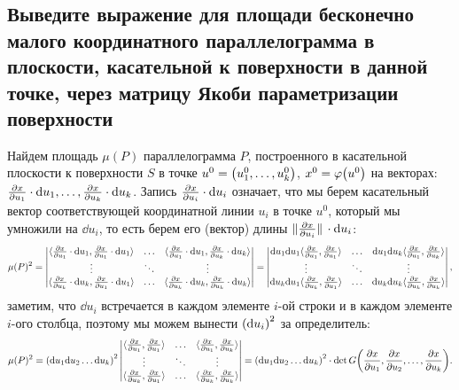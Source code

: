
\subsection{Выведите выражение для площади бесконечно малого координатного параллелограмма в плоскости, касательной к поверхности в данной точке, через матрицу Якоби параметризации поверхности}

Найдем площадь $\mu(P)$ параллелограмма $P$, построенного в касательной плоскости к поверхности $S$ в точке $u^{0} = \pqty{u_{1}^{0}, \ldots, u_{k}^{0}}$, $x^{0} = \varphi\pqty{u^{0}}$ на векторах: $\pdv{x}{u_{1}} \cdot \dd u_{1}, \ldots, \pdv{x}{u_{k}} \cdot \dd u_{k}$.
Запись $\pdv{x}{u_{i}} \cdot \dd u_{i}$ означает, что мы берем касательный вектор соответствующей координатной линии $u_{i}$ в точке $u^{0}$, который мы умножили на $\dd u_{i}$, то есть берем его (вектор) длины $\norm{\pdv{x}{u_{i}}} \cdot \dd u_{i}$:
\[
    \mu(P)^{2} = \begin{vmatrix}
        \langle \pdv{x}{u_{1}} \cdot \dd u_{1}, \pdv{x}{u_{1}} \cdot \dd u_{1} \rangle & \ldots & \langle \pdv{x}{u_{1}} \cdot \dd u_{1}, \pdv{x}{u_{k}} \cdot \dd u_{k} \rangle \\
        \vdots & \ddots & \vdots \\
        \langle \pdv{x}{u_{k}} \cdot \dd u_{k}, \pdv{x}{u_{1}} \cdot \dd u_{1} \rangle & \ldots & \langle \pdv{x}{u_{k}} \cdot \dd u_{k}, \pdv{x}{u_{k}} \cdot \dd u_{k} \rangle
    \end{vmatrix} = \begin{vmatrix}
        \dd u_{1} \dd u_{1} \langle \pdv{x}{u_{1}}, \pdv{x}{u_{1}} \rangle & \ldots & \dd u_{1} \dd u_{k} \langle \pdv{x}{u_{1}}, \pdv{x}{u_{k}} \rangle \\
        \vdots & \ddots & \vdots \\
        \dd u_{k} \dd u_{1} \langle \pdv{x}{u_{k}}, \pdv{x}{u_{1}} \rangle & \ldots & \dd u_{k} \dd u_{k} \langle \pdv{x}{u_{k}}, \pdv{x}{u_{k}} \rangle
    \end{vmatrix},
\]
заметим, что $\dd u_{i}$ встречается в каждом элементе $i$-ой строки и в каждом элементе $i$-ого столбца, поэтому мы можем вынести $\pqty{\dd u_{i}}^{2}$ за определитель:
\[
    \mu(P)^{2} = \pqty{\dd u_{1} \dd u_{2} \ldots \dd u_{k}}^{2} \begin{vmatrix}
        \langle \pdv{x}{u_{1}}, \pdv{x}{u_{1}} \rangle & \ldots & \langle \pdv{x}{u_{1}}, \pdv{x}{u_{k}} \rangle \\
        \vdots & \ddots & \vdots \\
        \langle \pdv{x}{u_{k}}, \pdv{x}{u_{1}} \rangle & \ldots & \langle \pdv{x}{u_{k}}, \pdv{x}{u_{k}} \rangle
    \end{vmatrix} = \pqty{\dd u_{1} \dd u_{2} \ldots \dd u_{k}}^{2} \cdot \det G\pqty{\pdv{x}{u_{1}}, \pdv{x}{u_{2}}, \ldots, \pdv{x}{u_{k}}}.
\]

